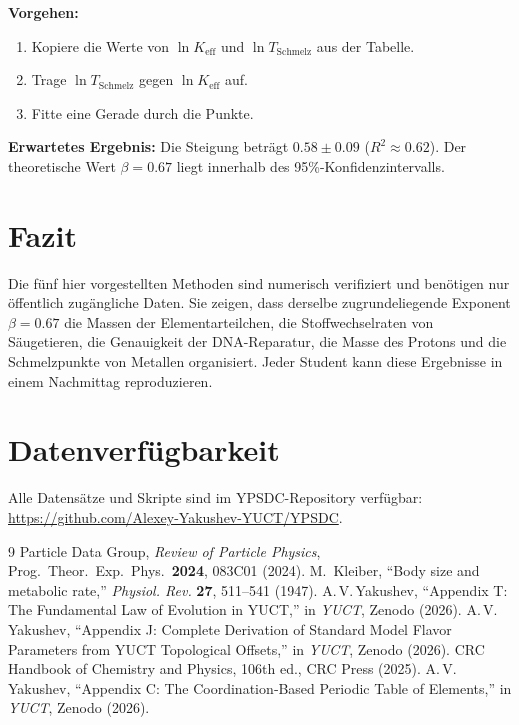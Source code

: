 \documentclass[12pt,a4paper]{article}
\newcommand{\Ke}{K_{\mathrm{eff}}}
\begin{document}
	\textbf{Vorgehen:}
	\begin{enumerate}[label=(\arabic*)]
		\item Kopiere die Werte von \(\ln \Ke\) und \(\ln T_{\text{Schmelz}}\) aus der Tabelle.
		\item Trage \(\ln T_{\text{Schmelz}}\) gegen \(\ln \Ke\) auf.
		\item Fitte eine Gerade durch die Punkte.
	\end{enumerate}
	
	\textbf{Erwartetes Ergebnis:} Die Steigung beträgt \(0.58 \pm 0.09\) (\(R^2 \approx 0.62\)).
	Der theoretische Wert \(\beta = 0.67\) liegt innerhalb des 95\%-Konfidenzintervalls.
	
	\section{Fazit}
	
	Die fünf hier vorgestellten Methoden sind numerisch verifiziert und benötigen
	nur öffentlich zugängliche Daten. Sie zeigen, dass derselbe zugrundeliegende
	Exponent \(\beta = 0.67\) die Massen der Elementarteilchen, die Stoffwechselraten
	von Säugetieren, die Genauigkeit der DNA-Reparatur, die Masse des Protons und
	die Schmelzpunkte von Metallen organisiert. Jeder Student kann diese Ergebnisse
	in einem Nachmittag reproduzieren.
	
	\section*{Datenverfügbarkeit}
	Alle Datensätze und Skripte sind im YPSDC-Repository verfügbar:\\
	\url{https://github.com/Alexey-Yakushev-YUCT/YPSDC}.
	
	\begin{thebibliography}{9}
		 Particle Data Group, \emph{Review of Particle Physics},
		Prog.\ Theor.\ Exp.\ Phys.\ \textbf{2024}, 083C01 (2024).
		 M.~Kleiber, ``Body size and metabolic rate,''
		\emph{Physiol. Rev.} \textbf{27}, 511--541 (1947).
		 A.\,V.\,Yakushev, ``Appendix T: The Fundamental Law
		of Evolution in YUCT,'' in \emph{YUCT}, Zenodo (2026).
		 A.\,V.\,Yakushev, ``Appendix J: Complete Derivation of
		Standard Model Flavor Parameters from YUCT Topological
		Offsets,'' in \emph{YUCT}, Zenodo (2026).
		 CRC Handbook of Chemistry and Physics, 106th ed.,
		CRC Press (2025).
		 A.\,V.\,Yakushev, ``Appendix C: The Coordination‑Based
		Periodic Table of Elements,'' in \emph{YUCT}, Zenodo (2026).
	\end{thebibliography}
	
\end{document}
